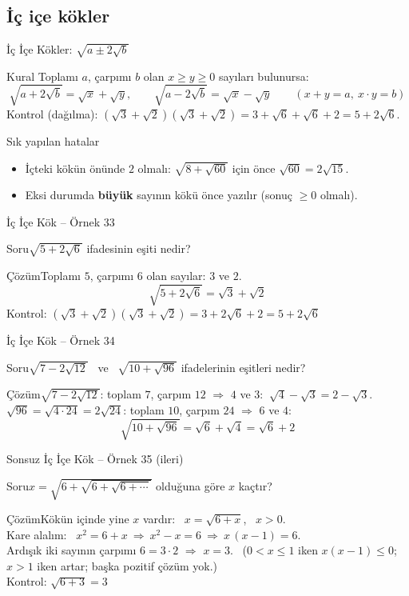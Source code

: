 \documentclass[aspectratio=169,11pt]{beamer}
\newcommand{\soru}[3]{%
\begin{frame}{#1}
  \begin{block}{Soru}\large #2\end{block}
  \pause
  \begin{exampleblock}{Çözüm}\large #3\end{exampleblock}
\end{frame}}
\begin{document}
\subsection{İç içe kökler}
\begin{frame}{İç İçe Kökler: \(\sqrt{a\pm 2\sqrt b}\)}
\begin{block}{Kural}
Toplamı \(a\), çarpımı \(b\) olan \(x\ge y\ge 0\) sayıları bulunursa:
\[\sqrt{a+2\sqrt b}=\sqrt x+\sqrt y,\qquad \sqrt{a-2\sqrt b}=\sqrt x-\sqrt y\qquad(x+y=a,\ x\cdot y=b)\]
Kontrol (dağılma): \((\sqrt3+\sqrt2)(\sqrt3+\sqrt2)=3+\sqrt6+\sqrt6+2=5+2\sqrt6\).
\end{block}
\begin{alertblock}{Sık yapılan hatalar}
\begin{itemize}
\item İçteki kökün önünde \textbf{\(2\)} olmalı: \(\sqrt{8+\sqrt{60}}\) için önce \(\sqrt{60}=2\sqrt{15}\).
\item Eksi durumda \textbf{büyük} sayının kökü önce yazılır (sonuç \(\ge 0\) olmalı).
\end{itemize}
\end{alertblock}
\end{frame}

\soru{İç İçe Kök -- Örnek 33}
{\(\sqrt{5+2\sqrt6}\) ifadesinin eşiti nedir?}
{Toplamı \(5\), çarpımı \(6\) olan sayılar: \(3\) ve \(2\).
\[\sqrt{5+2\sqrt6}=\sqrt3+\sqrt2\]
Kontrol: \((\sqrt3+\sqrt2)(\sqrt3+\sqrt2)=3+2\sqrt6+2=5+2\sqrt6\) \checkmark}

\soru{İç İçe Kök -- Örnek 34}
{\(\sqrt{7-2\sqrt{12}}\) \ ve \ \(\sqrt{10+\sqrt{96}}\) ifadelerinin eşitleri nedir?}
{\(\sqrt{7-2\sqrt{12}}\): toplam \(7\), çarpım \(12\) \(\Rightarrow\) \(4\) ve \(3\):
\(\ \sqrt4-\sqrt3=2-\sqrt3\).\\[4pt]
\(\sqrt{96}=\sqrt{4\cdot 24}=2\sqrt{24}\): toplam \(10\), çarpım \(24\) \(\Rightarrow\) \(6\) ve \(4\):
\[\sqrt{10+\sqrt{96}}=\sqrt6+\sqrt4=\sqrt6+2\]}

\soru{Sonsuz İç İçe Kök -- Örnek 35 (ileri)}
{\(x=\sqrt{6+\sqrt{6+\sqrt{6+\cdots}}}\) olduğuna göre \(x\) kaçtır?}
{Kökün içinde yine \(x\) vardır: \ \(x=\sqrt{6+x}\), \ \(x>0\).\\[3pt]
Kare alalım: \ \(x^2=6+x\ \Rightarrow\ x^2-x=6\ \Rightarrow\ x\,(x-1)=6\).\\[3pt]
Ardışık iki sayının çarpımı \(6=3\cdot 2\) \(\Rightarrow\) \(x=3\). \ (\(0<x\le 1\) iken \(x(x-1)\le 0\); \(x>1\) iken artar; başka pozitif çözüm yok.)\\[3pt]
Kontrol: \(\sqrt{6+3}=3\) \checkmark}
\end{document}

